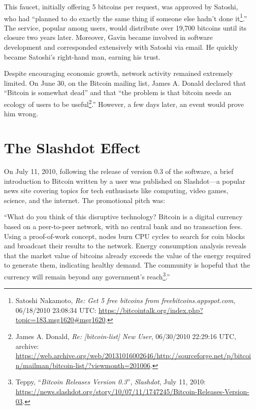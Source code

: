 \documentclass[
  a5paper,
  smalldemyvopaper,10pt,twoside,onecolumn,openright,extrafontsizes,hidelinks]{memoir}
\begin{document}
This faucet, initially offering 5 bitcoins per request, was approved by
Satoshi, who had ``planned to do exactly the same thing if someone else
hadn't done it\footnote{Satoshi Nakamoto, \emph{Re: Get 5 free bitcoins
  from freebitcoins.appspot.com}, 06/18/2010 23:08:34 UTC:
  \url{https://bitcointalk.org/index.php?topic=183.msg1620\#msg1620}.}.''
The service, popular among users, would distribute over 19,700 bitcoins
until its closure two years later. Moreover, Gavin became involved in
software development and corresponded extensively with Satoshi via
email. He quickly became Satoshi's right-hand man, earning his trust.

Despite encouraging economic growth, network activity remained extremely
limited. On June 30, on the Bitcoin mailing list, James A. Donald
declared that ``Bitcoin is somewhat dead'' and that ``the problem is
that bitcoin needs an ecology of users to be useful\footnote{James A.
  Donald, \emph{Re: {[}bitcoin-list{]} New User}, 06/30/2010 22:29:16
  UTC, archive:
  \url{https://web.archive.org/web/20131016002646/http://sourceforge.net/p/bitcoin/mailman/bitcoin-list/?viewmonth=201006}.}.''
However, a few days later, an event would prove him wrong.

\section*{The Slashdot Effect}\label{le-slashdotting}


On July 11, 2010, following the release of version 0.3 of the software,
a brief introduction to Bitcoin written by a user was published on
Slashdot---a popular news site covering topics for tech enthusiasts like
computing, video games, science, and the internet. The promotional pitch
was:

``What do you think of this disruptive technology? Bitcoin is a digital
currency based on a peer-to-peer network, with no central bank and no
transaction fees. Using a proof-of-work concept, nodes burn CPU cycles
to search for coin blocks and broadcast their results to the network.
Energy consumption analysis reveals that the market value of bitcoins
already exceeds the value of the energy required to generate them,
indicating healthy demand. The community is hopeful that the currency
will remain beyond any government's reach\footnote{Teppy,
  ``\emph{Bitcoin Releases Version 0.3}'', \emph{Slashdot}, July 11,
  2010:
  \url{https://news.slashdot.org/story/10/07/11/1747245/Bitcoin-Releases-Version-03}.}.''
\end{document}

